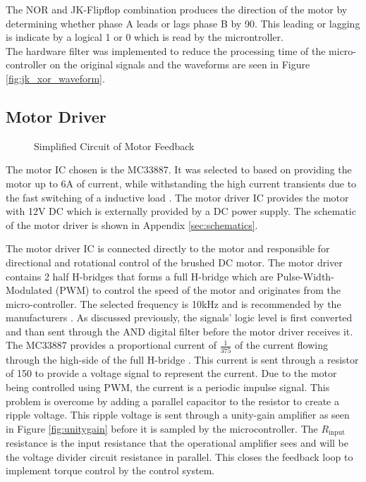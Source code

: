  The NOR and JK-Flipflop combination produces the direction of the motor by determining whether phase A leads or lags phase B by 90\textdegree. This leading or lagging is indicate by a logical 1 or 0 which is read by the microntroller.\\
 
 The hardware filter was implemented to reduce the processing time of the micro-controller on the original signals and the waveforms are seen in Figure \ref{fig:jk_xor_waveform}.



\subsection{Motor Driver}
\begin{figure}[h]
	\centering
	
	\caption{Simplified Circuit of Motor Feedback}
	\label{fig:feedback_current}
\end{figure}


The motor IC chosen is the MC33887. It was selected to based on providing the motor up to 6A of current, while withstanding the high current transients due to the fast switching of a inductive load \citep{motorIC}. The motor driver IC provides the motor with 12V DC which is externally provided by a DC power supply. The schematic of the motor driver is shown in Appendix \ref{sec:schematics}.

The motor driver IC is connected directly to the motor and responsible for directional and rotational control of the brushed DC motor. The motor driver contains 2 half H-bridges that forms a full H-bridge which are Pulse-Width-Modulated (PWM) to control the speed of the motor and originates from the micro-controller. The selected frequency is 10kHz and is recommended by the manufacturers \cite{motorIC}. As discussed previously, the signals' logic level is first converted and than sent through the AND digital filter before the motor driver receives it.\\

The MC33887 provides a proportional current of $\frac{1}{375}$ of the current flowing through the high-side of the full H-bridge \citep{motorIC}. This current is sent through a resistor of \SI{150}{\Omega} to provide a voltage signal to represent the current. Due to the motor being controlled using PWM, the current is a periodic impulse signal. This problem is overcome by adding a parallel capacitor to the resistor to create a ripple voltage. This ripple voltage is sent through a unity-gain amplifier as seen in Figure \ref{fig:unitygain} before it is sampled by the microcontroller. The $R_{\text{input}}$ resistance is the input resistance that the operational amplifier sees and will be the voltage divider circuit resistance in parallel. This closes the feedback loop to implement torque control by the control system.\\


